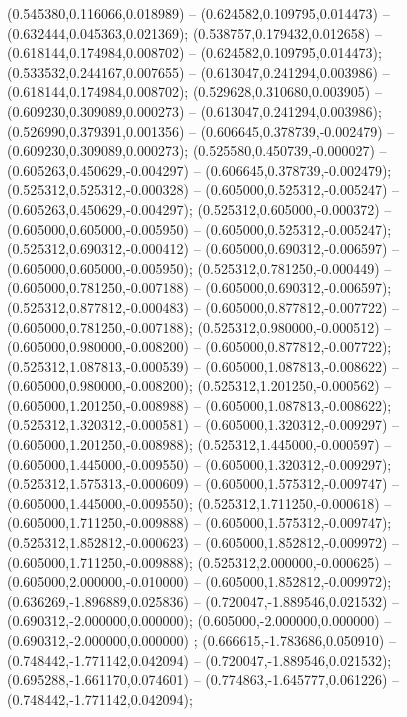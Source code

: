  (0.545380,0.116066,0.018989) -- (0.624582,0.109795,0.014473) -- (0.632444,0.045363,0.021369);
 (0.538757,0.179432,0.012658) -- (0.618144,0.174984,0.008702) -- (0.624582,0.109795,0.014473);
 (0.533532,0.244167,0.007655) -- (0.613047,0.241294,0.003986) -- (0.618144,0.174984,0.008702);
 (0.529628,0.310680,0.003905) -- (0.609230,0.309089,0.000273) -- (0.613047,0.241294,0.003986);
 (0.526990,0.379391,0.001356) -- (0.606645,0.378739,-0.002479) -- (0.609230,0.309089,0.000273);
 (0.525580,0.450739,-0.000027) -- (0.605263,0.450629,-0.004297) -- (0.606645,0.378739,-0.002479);
 (0.525312,0.525312,-0.000328) -- (0.605000,0.525312,-0.005247) -- (0.605263,0.450629,-0.004297);
 (0.525312,0.605000,-0.000372) -- (0.605000,0.605000,-0.005950) -- (0.605000,0.525312,-0.005247);
 (0.525312,0.690312,-0.000412) -- (0.605000,0.690312,-0.006597) -- (0.605000,0.605000,-0.005950);
 (0.525312,0.781250,-0.000449) -- (0.605000,0.781250,-0.007188) -- (0.605000,0.690312,-0.006597);
 (0.525312,0.877812,-0.000483) -- (0.605000,0.877812,-0.007722) -- (0.605000,0.781250,-0.007188);
 (0.525312,0.980000,-0.000512) -- (0.605000,0.980000,-0.008200) -- (0.605000,0.877812,-0.007722);
 (0.525312,1.087813,-0.000539) -- (0.605000,1.087813,-0.008622) -- (0.605000,0.980000,-0.008200);
 (0.525312,1.201250,-0.000562) -- (0.605000,1.201250,-0.008988) -- (0.605000,1.087813,-0.008622);
 (0.525312,1.320312,-0.000581) -- (0.605000,1.320312,-0.009297) -- (0.605000,1.201250,-0.008988);
 (0.525312,1.445000,-0.000597) -- (0.605000,1.445000,-0.009550) -- (0.605000,1.320312,-0.009297);
 (0.525312,1.575313,-0.000609) -- (0.605000,1.575312,-0.009747) -- (0.605000,1.445000,-0.009550);
 (0.525312,1.711250,-0.000618) -- (0.605000,1.711250,-0.009888) -- (0.605000,1.575312,-0.009747);
 (0.525312,1.852812,-0.000623) -- (0.605000,1.852812,-0.009972) -- (0.605000,1.711250,-0.009888);
 (0.525312,2.000000,-0.000625) -- (0.605000,2.000000,-0.010000) -- (0.605000,1.852812,-0.009972);
 (0.636269,-1.896889,0.025836) -- (0.720047,-1.889546,0.021532) -- (0.690312,-2.000000,0.000000);
 (0.605000,-2.000000,0.000000) -- (0.690312,-2.000000,0.000000) ;
 (0.666615,-1.783686,0.050910) -- (0.748442,-1.771142,0.042094) -- (0.720047,-1.889546,0.021532);
 (0.695288,-1.661170,0.074601) -- (0.774863,-1.645777,0.061226) -- (0.748442,-1.771142,0.042094);

